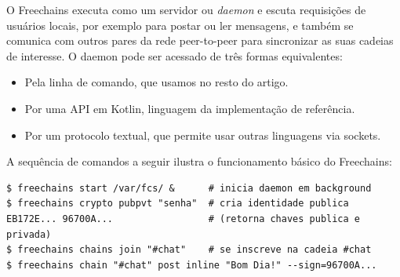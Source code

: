 \documentclass[12pt]{article}
\newcommand{\FC} {Freechains\xspace}
\begin{document}
O \FC executa como um servidor ou \emph{daemon} e escuta requisições de
usuários locais, por exemplo para postar ou ler mensagens, e também se comunica
com outros pares da rede peer-to-peer para sincronizar as suas cadeias de
interesse.
O daemon pode ser acessado de três formas equivalentes:
%
\begin{itemize}
\item Pela linha de comando, que usamos no resto do artigo.
\item Por uma API em Kotlin, linguagem da implementação de referência.
\item Por um protocolo textual, que permite usar outras linguagens via sockets.
\end{itemize}
%

%
A sequência de comandos a seguir ilustra o funcionamento básico do \FC:
%
{\footnotesize
\begin{verbatim}
$ freechains start /var/fcs/ &      # inicia daemon em background
$ freechains crypto pubpvt "senha"  # cria identidade publica
EB172E... 96700A...                 # (retorna chaves publica e privada)
$ freechains chains join "#chat"    # se inscreve na cadeia #chat
$ freechains chain "#chat" post inline "Bom Dia!" --sign=96700A...
\end{verbatim}
}
\end{document}
